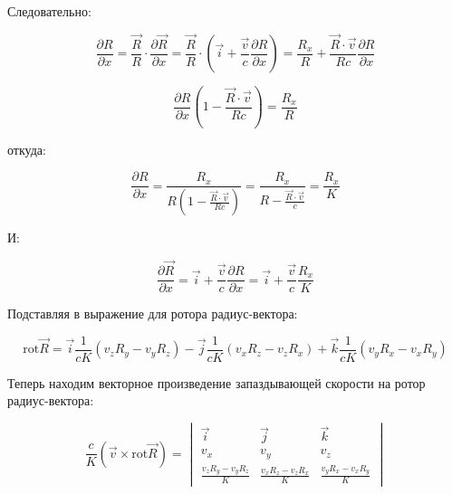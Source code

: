 \documentclass[12pt, a4paper]{article}
\begin{document}
Следовательно:

\begin{equation}
\frac{\partial R}{\partial x} = \frac{\vec{R}}{R} \cdot \frac{\partial \vec{R}}{\partial x} = \frac{\vec{R}}{R} \cdot \left( \vec{i} + \frac{\vec{v}}{c} \frac{\partial R}{\partial x} \right) = \frac{R_x}{R} + \frac{\vec{R} \cdot \vec{v}}{Rc} \frac{\partial R}{\partial x}
\label{eq:dR_dx_solved}
\end{equation}

\begin{equation}
\frac{\partial R}{\partial x} \left( 1 - \frac{\vec{R} \cdot \vec{v}}{Rc} \right) = \frac{R_x}{R}
\label{eq:dR_dx_solved2}
\end{equation}

откуда:

\begin{equation}
\frac{\partial R}{\partial x} = \frac{R_x}{R \left( 1 - \frac{\vec{R} \cdot \vec{v}}{Rc} \right)} = \frac{R_x}{R - \frac{\vec{R} \cdot \vec{v}}{c}} = \frac{R_x}{K}
\label{eq:dR_dx_final2}
\end{equation}

И:

\begin{equation}
\frac{\partial \vec{R}}{\partial x} = \vec{i} + \frac{\vec{v}}{c} \frac{\partial R}{\partial x} = \vec{i} + \frac{\vec{v}}{c} \frac{R_x}{K}
\label{eq:dR_vec_dx}
\end{equation}

Подставляя в выражение для ротора радиус-вектора:

\begin{equation}
\text{rot} \vec{R} = \vec{i} \frac{1}{cK} (v_z R_y - v_y R_z) - \vec{j} \frac{1}{cK} (v_x R_z - v_z R_x) + \vec{k} \frac{1}{cK} (v_y R_x - v_x R_y)
\label{eq:rot_R_final2}
\end{equation}

Теперь находим векторное произведение запаздывающей скорости на ротор радиус-вектора:

\begin{equation}
\frac{c}{K} (\vec{v} \times \text{rot} \vec{R}) = \begin{vmatrix} \vec{i} & \vec{j} & \vec{k} \\ v_x & v_y & v_z \\ \frac{v_z R_y - v_y R_z}{K} & \frac{v_x R_z - v_z R_x}{K} & \frac{v_y R_x - v_x R_y}{K} \end{vmatrix}
\label{eq:v_cross_rot_R}
\end{equation}
\end{document}
